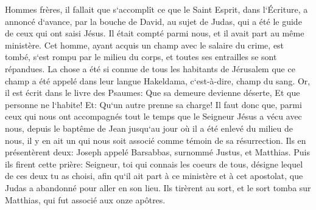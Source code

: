 \verse Hommes frères, il fallait que s`accomplît ce que le Saint Esprit, dans l`Écriture, a annoncé d`avance, par la bouche de David, au sujet de Judas, qui a été le guide de ceux qui ont saisi Jésus. 
\verse Il était compté parmi nous, et il avait part au même ministère. 
\verse Cet homme, ayant acquis un champ avec le salaire du crime, est tombé, s`est rompu par le milieu du corps, et toutes ses entrailles se sont répandues. 
\verse La chose a été si connue de tous les habitants de Jérusalem que ce champ a été appelé dans leur langue Hakeldama, c`est-à-dire, champ du sang. 
\verse Or, il est écrit dans le livre des Psaumes: Que sa demeure devienne déserte, Et que personne ne l`habite! Et: Qu`un autre prenne sa charge! 
\verse Il faut donc que, parmi ceux qui nous ont accompagnés tout le temps que le Seigneur Jésus a vécu avec nous, 
\verse depuis le baptême de Jean jusqu`au jour où il a été enlevé du milieu de nous, il y en ait un qui nous soit associé comme témoin de sa résurrection. 
\verse Ils en présentèrent deux: Joseph appelé Barsabbas, surnommé Justus, et Matthias. 
\verse Puis ils firent cette prière: Seigneur, toi qui connais les coeurs de tous, désigne lequel de ces deux tu as choisi, 
\verse afin qu`il ait part à ce ministère et à cet apostolat, que Judas a abandonné pour aller en son lieu. 
\verse Ils tirèrent au sort, et le sort tomba sur Matthias, qui fut associé aux onze apôtres. 

\chapter{}

